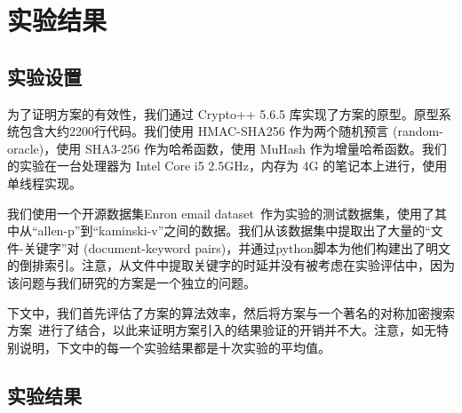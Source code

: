 \section{实验结果}



\subsection{实验设置}
为了证明方案\single 的有效性，我们通过 Crypto++ 5.6.5 库实现了方案的原型。原型系统包含大约2200行代码。我们使用 HMAC-SHA256 作为两个随机预言 (random-oracle)，使用 SHA3-256 作为哈希函数，使用 MuHash 作为增量哈希函数。我们的实验在一台处理器为 Intel Core i5 2.5GHz，内存为 4G 的笔记本上进行，使用单线程实现。

我们使用一个开源数据集Enron email dataset~\cite{enronemail}作为实验的测试数据集，使用了其中从“allen-p”到“kaminski-v”之间的数据。我们从该数据集中提取出了大量的“文件-关键字”对 (document-keyword pairs)，并通过python脚本为他们构建出了明文的倒排索引。注意，从文件中提取关键字的时延并没有被考虑在实验评估中，因为该问题与我们研究的\single 方案是一个独立的问题。

下文中，我们首先评估了\single 方案的算法效率，然后将\single 方案与一个著名的对称加密搜索方案~\cite{cash2014dynamic}进行了结合，以此来证明\single 方案引入的结果验证的开销并不大。注意，如无特别说明，下文中的每一个实验结果都是十次实验的平均值。


\subsection{实验结果}

